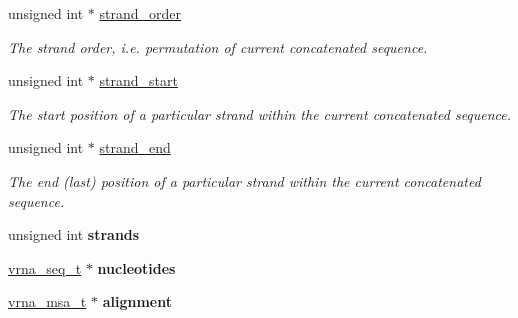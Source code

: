 \begin{Indent}
\begin{DoxyCompactItemize}
\mbox{\label{group__fold__compound_a3bf15e0e44539f9f622fd09227bf3de1}} 
unsigned int $\ast$ \mbox{\hyperlink{group__fold__compound_a3bf15e0e44539f9f622fd09227bf3de1}{strand\+\_\+order}}
\begin{DoxyCompactList}\small\item\em The strand order, i.\+e. permutation of current concatenated sequence. \end{DoxyCompactList}\item 
\mbox{\label{group__fold__compound_a571ee9a932f633c7d9167ae029573935}} 
unsigned int $\ast$ \mbox{\hyperlink{group__fold__compound_a571ee9a932f633c7d9167ae029573935}{strand\+\_\+start}}
\begin{DoxyCompactList}\small\item\em The start position of a particular strand within the current concatenated sequence. \end{DoxyCompactList}\item 
\mbox{\label{group__fold__compound_aaa1b51bc6eb47cc661fea834d7175a54}} 
unsigned int $\ast$ \mbox{\hyperlink{group__fold__compound_aaa1b51bc6eb47cc661fea834d7175a54}{strand\+\_\+end}}
\begin{DoxyCompactList}\small\item\em The end (last) position of a particular strand within the current concatenated sequence. \end{DoxyCompactList}\item 
\mbox{\label{group__fold__compound_ad8962b97f5e5e233d9bfb5b16a691d26}} 
unsigned int {\bfseries strands}
\item 
\mbox{\label{group__fold__compound_a855b503aefd052430bf463d8518d2ff5}} 
\mbox{\hyperlink{group__alphabet__utils_gaa35bee3061759495467070b47d0e1f22}{vrna\+\_\+seq\+\_\+t}} $\ast$ {\bfseries nucleotides}
\item 
\mbox{\label{group__fold__compound_a0387efd460429ca0847c8009d327c0fb}} 
\mbox{\hyperlink{group__alphabet__utils_structvrna__alignment__s}{vrna\+\_\+msa\+\_\+t}} $\ast$ {\bfseries alignment}
\item 
\mbox{\label{group__fold__compound_aceaa904dbf50092d403ca99422e8f824}} 

\end{DoxyCompactItemize}
\end{Indent}
